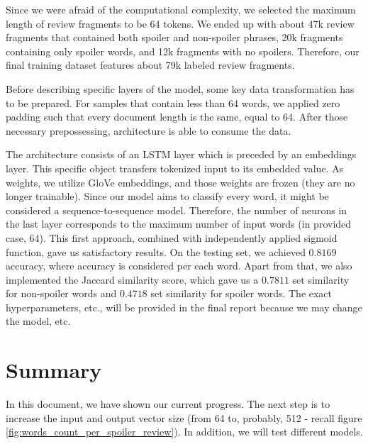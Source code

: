 \documentclass[11pt]{article}
\begin{document}
Since we were afraid of the computational complexity, we selected the maximum length of review fragments to be 64 tokens. We ended up with about 47k review fragments that contained both spoiler and non-spoiler phrases, 20k fragments containing only spoiler words, and 12k fragments with no spoilers. Therefore, our final training dataset features about 79k labeled review fragments. 

Before describing specific layers of the model, some key data transformation has to be prepared. For samples that contain less than 64 words, we applied zero padding such that every document length is the same, equal to 64. After those necessary prepossessing, architecture is able to consume the data.

The architecture consists of an LSTM layer which is preceded by an embeddings layer. This specific object transfers tokenized input to its embedded value. As weights, we utilize GloVe embeddings, and those weights are frozen (they are no longer trainable). Since our model aims to classify every word, it might be considered a sequence-to-sequence model. Therefore, the number of neurons in the last layer corresponds to the maximum number of input words (in provided case, 64). This first approach, combined with independently applied sigmoid function, gave us satisfactory results. On the testing set, we achieved $0.8169$ accuracy, where accuracy is considered per each word. Apart from that, we also implemented the Jaccard similarity score, which gave us a $0.7811$ set similarity for non-spoiler words and $0.4718$ set similarity for spoiler words. The exact hyperparameters, etc., will be provided in the final report because we may change the model, etc.


\section{Summary}
In this document, we have shown our current progress. The next step is to increase the input and output vector size (from 64 to, probably, 512 - recall figure \ref{fig:words_count_per_spoiler_review}). In addition, we will test different models.




\end{document}
